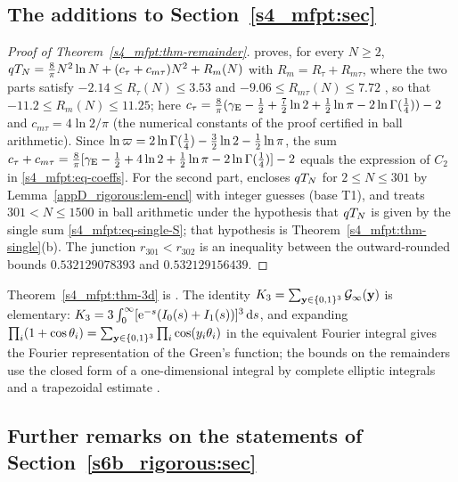 \subsection{The additions to Section~\ref{s4_mfpt:sec}}

\begin{proof}[Proof of Theorem~\ref{s4_mfpt:thm-remainder}]
  proves, for every $N\ge2$, $qT_{N}=\frac8\pi N^{2}\ln N+(c_\tau+c_{m\tau})N^{2}+R_m(N)$ with
$R_m=R_\tau+R_{m\tau}$, where the two parts satisfy $-2.14\le R_\tau(N)\le3.53$ and $-9.06\le R_{m\tau}(N)\le7.72$
, so that $-11.2\le R_m(N)\le11.25$; here
$c_\tau=\frac8\pi(\gamma_{\mathrm{E}}-\frac12+\frac72\ln2+\frac12\ln\pi-2\ln\Gamma(\frac14))-2$ and $c_{m\tau}=4\ln2/\pi$
(the numerical constants of the proof certified in ball arithmetic). Since
$\ln\varpi=2\ln\Gamma(\frac14)-\frac32\ln2-\frac12\ln\pi$, the sum $c_\tau+c_{m\tau}
=\frac8\pi[\gamma_{\mathrm{E}}-\frac12+4\ln2+\frac12\ln\pi-2\ln\Gamma(\frac14)]-2$ equals the expression of $C_{2}$ in
\eqref{s4_mfpt:eq-coeffs}. For the second part,  encloses $qT_{N}$ for $2\le N\le301$ by
Lemma~\ref{appD_rigorous:lem-encl} with integer guesses (base T1), and  treats $301<N\le1500$ in ball
arithmetic under the hypothesis that $qT_{N}$ is given by the single sum \eqref{s4_mfpt:eq-single-S}; that hypothesis is
Theorem~\ref{s4_mfpt:thm-single}(b). The junction $r_{301}<r_{302}$ is an inequality between the outward-rounded bounds
$0.532129078393$ and $0.532129156439$.
\end{proof}

Theorem~\ref{s4_mfpt:thm-3d} is . The identity $K_{3}=\sum_{\mathbf{y}\in\{0,1\}^{3}}\mathcal{G}_{\infty}(\mathbf{y})$ is
elementary: $K_{3}=3\int_0^\infty[\mathrm{e}^{-s}(I_0(s)+I_1(s))]^{3}\,\mathrm{d} s$, and expanding
$\prod_i(1+\cos\theta_i)=\sum_{\mathbf{y}\in\{0,1\}^{3}}\prod_i\cos(y_i\theta_i)$ in the equivalent Fourier integral gives
the Fourier representation of the Green's function; the bounds on the remainders use the closed form of a
one-dimensional integral by complete elliptic integrals and a trapezoidal estimate .

\subsection{Further remarks on the statements of Section~\ref{s6b_rigorous:sec}}\label{appD_rigorous:ssec-remarks}

